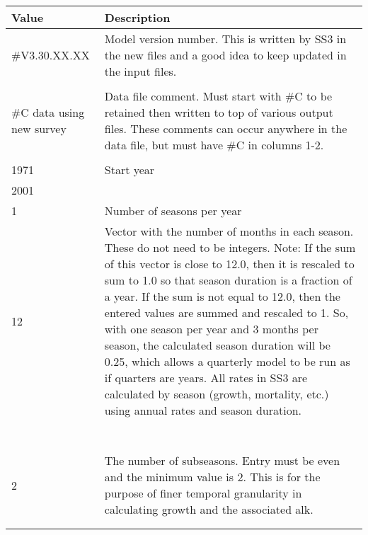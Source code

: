 \begin{center}
	\begin{longtable}{p{3cm} p{12cm}}
		\hline
		\textbf{Value} & \textbf{Description} \Tstrut\Bstrut\\
		\hline
		\#V3.30.XX.XX & \multirow{1}{1cm}[-0.1cm]{\parbox{12cm}{Model version number. This is written by SS3 in the new files and a good idea to keep updated in the input files.}} \Tstrut\\
		& \Bstrut\\

		\hline
		\#C data using new survey & \multirow{1}{1cm}[-0.1cm]{\parbox{12cm}{Data file comment. Must start with \#C to be retained then written to top of various output files. These comments can occur anywhere in the data file, but must have \#C in columns 1-2.}} \Tstrut\\
		&  \Bstrut\\

		\hline
		1971 & Start year \Tstrut\Bstrut\\

		\hline
		2001 & \raisebox{0.1\ht\strutbox}{\hypertarget{EndYear}{End year}} \Tstrut\Bstrut\\

		\hline
		1 & Number of seasons per year \Tstrut\Bstrut\\

		\hline
		12 & \multirow{1}{1cm}[-0.1cm]{\parbox{12cm}{Vector with the number of months in each season. These do not need to be integers. Note: If the sum of this vector is close to 12.0, then it is rescaled to sum to 1.0 so that season duration is a fraction of a year. If the sum is not equal to 12.0, then the entered values are summed and rescaled to 1. So, with one season per year and 3 months per season, the calculated season duration will be 0.25, which allows a quarterly model to be run as if quarters are years. All rates in SS3 are calculated by season (growth, mortality, etc.) using annual rates and season duration.}} \Tstrut\\
		& \\
		& \\
		& \\
		& \\
		& \\
		& \\
		& \Bstrut\\
		
		\hline
		2 & \multirow{1}{1cm}[-0.1cm]{\parbox{12cm}{The number of subseasons. Entry must be even and the minimum value is 2. This is for the purpose of finer temporal granularity in calculating growth and the associated \gls{alk}.}} \Tstrut\\
		& \\
		& \Bstrut\\
		

\end{longtable}
\end{center}
